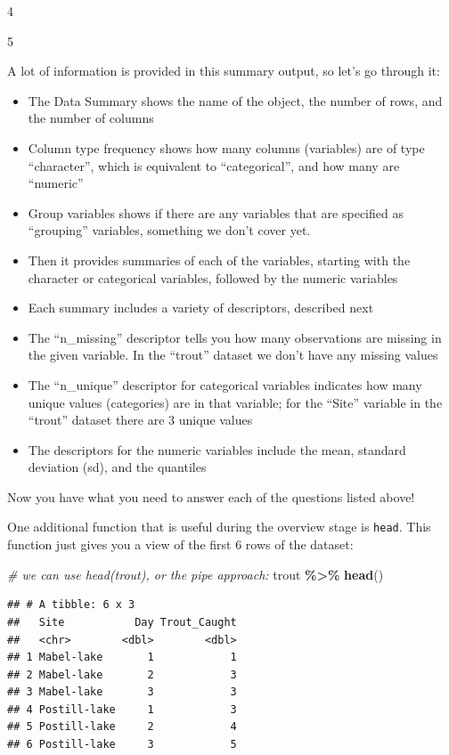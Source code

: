 \documentclass[
]{book}
\newenvironment{Shaded}{\begin{snugshade}}{\end{snugshade}}
\newcommand{\CommentTok}[1]{\textcolor[rgb]{0.56,0.35,0.01}{\textit{#1}}}
\newcommand{\FunctionTok}[1]{\textcolor[rgb]{0.13,0.29,0.53}{\textbf{#1}}}
\newcommand{\NormalTok}[1]{#1}
\newcommand{\SpecialCharTok}[1]{\textcolor[rgb]{0.81,0.36,0.00}{\textbf{#1}}}
\providecommand{\tightlist}{%
  \setlength{\itemsep}{0pt}\setlength{\parskip}{0pt}}
\begin{document}
4

5

A lot of information is provided in this summary output, so let's go through it:

\begin{itemize}
\tightlist
\item
  The Data Summary shows the name of the object, the number of rows, and the number of columns
\item
  Column type frequency shows how many columns (variables) are of type ``character'', which is equivalent to ``categorical'', and how many are ``numeric''
\item
  Group variables shows if there are any variables that are specified as ``grouping'' variables, something we don't cover yet.
\item
  Then it provides summaries of each of the variables, starting with the character or categorical variables, followed by the numeric variables
\item
  Each summary includes a variety of descriptors, described next
\item
  The ``n\_missing'' descriptor tells you how many observations are missing in the given variable. In the ``trout'' dataset we don't have any missing values
\item
  The ``n\_unique'' descriptor for categorical variables indicates how many unique values (categories) are in that variable; for the ``Site'' variable in the ``trout'' dataset there are 3 unique values
\item
  The descriptors for the numeric variables include the mean, standard deviation (sd), and the quantiles
\end{itemize}

Now you have what you need to answer each of the questions listed above!

One additional function that is useful during the overview stage is \texttt{head}. This function just gives you a view of the first 6 rows of the dataset:

\begin{Shaded}
\begin{Highlighting}[]
\CommentTok{\# we can use head(trout), or the pipe approach: }
\NormalTok{trout }\SpecialCharTok{\%\textgreater{}\%}
  \FunctionTok{head}\NormalTok{()}
\end{Highlighting}
\end{Shaded}

\begin{verbatim}
## # A tibble: 6 x 3
##   Site           Day Trout_Caught
##   <chr>        <dbl>        <dbl>
## 1 Mabel-lake       1            1
## 2 Mabel-lake       2            3
## 3 Mabel-lake       3            3
## 4 Postill-lake     1            3
## 5 Postill-lake     2            4
## 6 Postill-lake     3            5
\end{verbatim}
\end{document}
